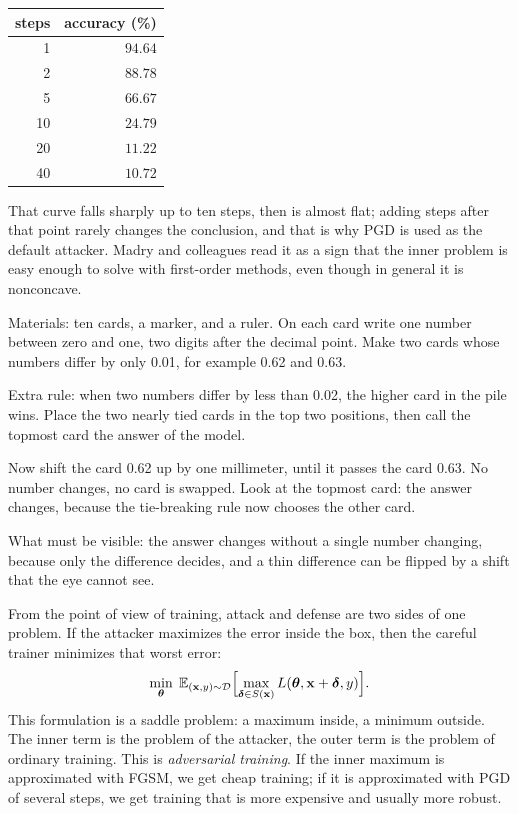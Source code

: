 \begin{center}
\begin{tabular}{rr}
\hline
steps & accuracy (\%) \\
\hline
1  & $94.64$ \\
2  & $88.78$ \\
5  & $66.67$ \\
10 & $24.79$ \\
20 & $11.22$ \\
40 & $10.72$ \\
\hline
\end{tabular}
\end{center}

That curve falls sharply up to ten steps, then is almost flat; adding steps after
that point rarely changes the conclusion, and that is why PGD is used as the default
attacker. Madry and colleagues read it as a sign that the inner problem is easy
enough to solve with first-order methods, even though in general it is nonconcave.

\begin{tangan}
Materials: ten cards, a marker, and a ruler. On each card write one number between
zero and one, two digits after the decimal point. Make two cards whose numbers differ
by only 0.01, for example 0.62 and 0.63.

Extra rule: when two numbers differ by less than 0.02, the higher card in the pile
wins. Place the two nearly tied cards in the top two positions, then call the topmost
card the answer of the model.

Now shift the card 0.62 up by one millimeter, until it passes the card 0.63. No
number changes, no card is swapped. Look at the topmost card: the answer changes,
because the tie-breaking rule now chooses the other card.

What must be visible: the answer changes without a single number changing, because
only the difference decides, and a thin difference can be flipped by a shift that the
eye cannot see.
\end{tangan}

From the point of view of training, attack and defense are two sides of one problem.
If the attacker maximizes the error inside the box, then the careful trainer
minimizes that worst error:
\[
  \min_{\boldsymbol{\theta}}\;
  \mathbb{E}_{(\mathbf{x},y)\sim\mathcal{D}}
  \Bigl[\max_{\boldsymbol{\delta}\in S(\mathbf{x})}
  L(\boldsymbol{\theta},\mathbf{x}+\boldsymbol{\delta},y)\Bigr].
\]
This formulation is a saddle problem: a maximum inside, a minimum outside. The inner
term is the problem of the attacker, the outer term is the problem of ordinary
training. This is \emph{adversarial training}. If the inner maximum is approximated
with FGSM, we get cheap training; if it is approximated with PGD of several steps, we
get training that is more expensive and usually more robust.

